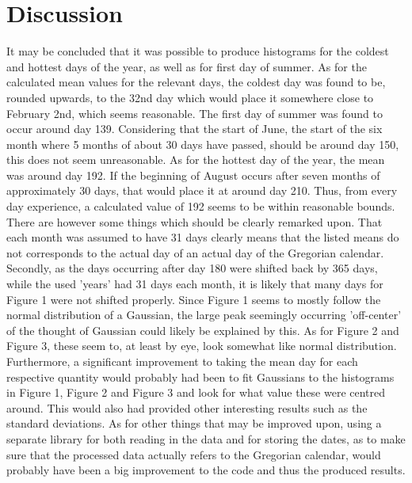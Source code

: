 \documentclass[a4, 12pt]{article}
\begin{document}
\newpage
\section{Discussion}
It may be concluded that it was possible to produce histograms for the coldest and hottest days of the year, as well as for first day of summer. As for the calculated mean values for the relevant days, the coldest day was found to be, rounded upwards, to the 32nd day which would place it somewhere close to February 2nd, which seems reasonable. The first day of summer was found to occur around day 139. Considering that the start of June, the start of the six month where 5 months of about 30 days have passed, should be around day 150, this does not seem unreasonable. As for the hottest day of the year, the mean was around day 192. If the beginning of August occurs after seven months of approximately 30 days, that would place it at around day 210. Thus, from every day experience, a calculated value of 192 seems to be within reasonable bounds. \newline 
\indent There are however some things which should be clearly remarked upon. That each month was assumed to have 31 days clearly means that the listed means do not corresponds to the actual day of an actual day of the Gregorian calendar. Secondly, as the days occurring after day 180 were shifted back by 365 days, while the used 'years' had 31 days each month, it is likely that many days for Figure 1 were not shifted properly. Since Figure 1 seems to mostly follow the normal distribution of a Gaussian, the large peak seemingly occurring 'off-center' of the thought of Gaussian could likely be explained by this. As for Figure 2 and Figure 3, these seem to, at least by eye, look somewhat like normal distribution. Furthermore, a significant improvement to taking the mean day for each respective quantity would probably had been to fit Gaussians to the histograms in Figure 1, Figure 2 and Figure 3 and look for what value these were centred around. This would also had provided other interesting results such as the standard deviations. \newline
\indent As for other things that may be improved upon, using a separate library for both reading in the data and for storing the dates, as to make sure that the processed data actually refers to the Gregorian calendar, would probably have been a big improvement to the code and thus the produced results. \newline
\end{document}
